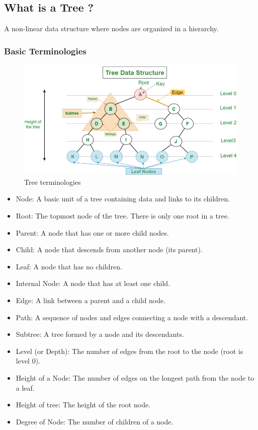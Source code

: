 \subsection{What is a Tree ?}
\begin{tcolorbox}[title=Tree definition,coltitle =black,fonttitle=\large\bfseries,colback=green!5!white,colframe=green!75!black]
	A non-linear data structure where nodes are organized in a hierarchy.
\end{tcolorbox}

\subsubsection{Basic Terminologies}
\begin{figure}[H]
	\centering
	\includegraphics[width=1\textwidth]{figures/tree}
	\caption{Tree terminologies}
\end{figure}
\begin{itemize}
	\item Node: A basic unit of a tree containing data and links to its children.
	\item Root: The topmost node of the tree. There is only one root in a tree.
	\item Parent: A node that has one or more child nodes.
	\item Child: A node that descends from another node (its parent).
	\item Leaf: A node that has no children.
	\item Internal Node: A node that has at least one child.
	\item Edge: A link between a parent and a child node.
	\item Path: A sequence of nodes and edges connecting a node with a descendant.
	\item Subtree: A tree formed by a node and its descendants.
	\item Level (or Depth): The number of edges from the root to the node (root is level 0).
	\item Height of a Node: The number of edges on the longest path from the node to a leaf.
	\item Height of tree: The height of the root node.
	\item Degree of Node: The number of children of a node.
\end{itemize}

